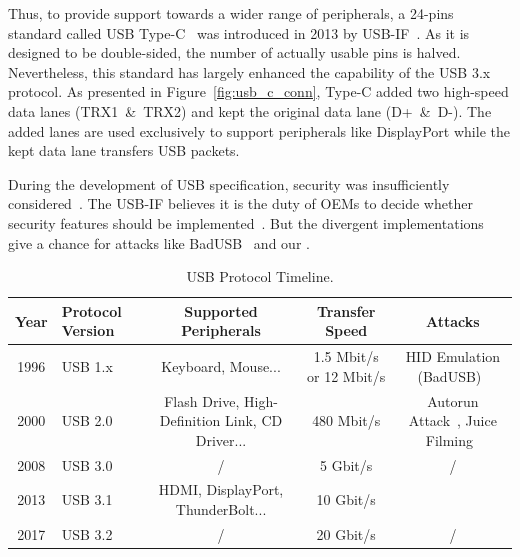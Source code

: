 Thus, to provide support towards a wider range of peripherals, a 24-pins
standard called \ac{USB} Type-C~\cite{typec} was introduced in 2013 by \ac{USB}-IF~\cite{usbif}. As it is designed to be double-sided, the number of actually usable
pins is halved. Nevertheless, this standard has largely enhanced the capability
of the \ac{USB} 3.x protocol. As presented in Figure~\ref{fig:usb_c_conn}, Type-C added
two high-speed data lanes \mbox{(TRX1 \& TRX2)} and kept the original data lane \mbox{(D+ \&
D-)}. The added lanes are used exclusively to support peripherals like
DisplayPort while the kept data lane transfers \ac{USB} packets.

During the development of \ac{USB} specification, security was insufficiently considered~\cite{sok}. 
The \ac{USB}-IF believes it is the duty of \acp{OEM}
to decide whether security features should be implemented~\cite{usbsec}. But the divergent implementations give a chance for attacks like
BadUSB~\cite{rubber} and our \tool.

\begin{table}
\begin{tabular}{|c|l|c|c|c|}
	\hline
	\textbf{Year} & \textbf{Protocol Version} & \textbf{Supported Peripherals} & \textbf{Transfer Speed} & \textbf{Attacks} \\
	\hline
	1996 & \ac{USB} 1.x~\cite{usb10,usb11} & Keyboard, Mouse... & 1.5 Mbit/s or 12 Mbit/s & \ac{HID} Emulation (BadUSB)~\cite{badusb} \\
	\hline
	2000 & \ac{USB} 2.0~\cite{usb20} & Flash Drive, High-Definition Link, CD Driver... & 480 Mbit/s & Autorun Attack~\cite{duqu}, Juice Filming~\cite{JFC,JFCImpact} \\
	\hline
	2008 & \ac{USB} 3.0~\cite{usb30} & / & 5 Gbit/s & / \\
	\hline
	2013 & \ac{USB} 3.1~\cite{usb31} & HDMI, DisplayPort, ThunderBolt... & 10 Gbit/s & \tool \\
	\hline
	2017 & \ac{USB} 3.2~\cite{usb32} & / & 20 Gbit/s & / \\
	\hline
\end{tabular}
	\linebreak
\caption{\ac{USB} Protocol Timeline.}
\label{table:usb_timeline}
\end{table}
